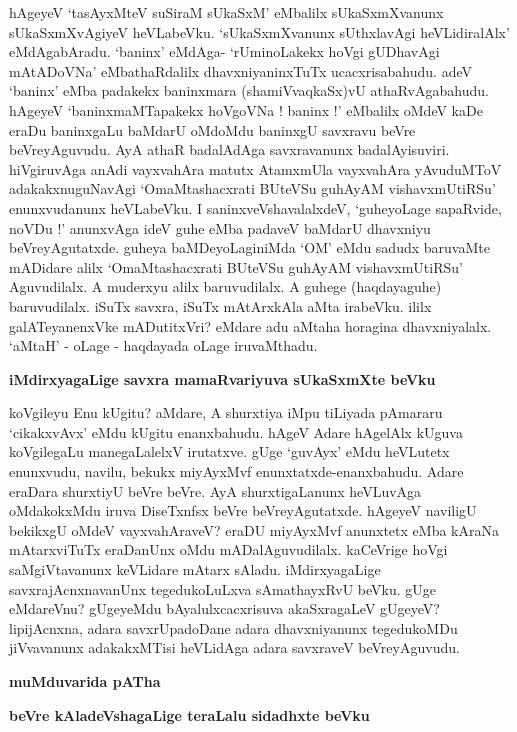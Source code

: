 \noindent
hAgeyeV `tasAyxMteV suSiraM sUkaSxM' eMbalilx sUkaSxmXvanunx sUkaSxmXvAgiyeV heVLabeVku. `sUkaSxmXvanunx sUthxlavAgi heVLidiralAlx' 
eMdAgabAradu. `baninx' eMdAga- `rUminoLakekx hoVgi gUDhavAgi mAtADoVNa' eMbathaRdalilx dhavxniyaninxTuTx ucacxrisabahudu. adeV `baninx' eMba padakekx baninxmara (shamiVvaqkaSx)vU athaRvAgabahudu. hAgeyeV `baninxmaMTapakekx hoVgoVNa ! baninx !' eMbalilx oMdeV kaDe eraDu baninxgaLu baMdarU oMdoMdu baninxgU savxravu beVre beVreyAguvudu. AyA athaR badalAdAga savxravanunx badalAyisuviri. hiVgiruvAga anAdi vayxvahAra matutx AtamxmUla vayxvahAra yAvuduMToV adakakxnuguNavAgi `OmaMtashacxrati BUteVSu guhAyAM vishavxmUtiRSu'\label{125} enunxvudanunx heVLabeVku. I saninxveVshavalalxdeV, `guheyoLage sapaRvide, noVDu !' anunxvAga ideV guhe eMba padaveV baMdarU dhavxniyu beVreyAgutatxde. guheya baMDeyoLaginiMda `OM' eMdu sadudx baruvaMte mADidare alilx `OmaMtashacxrati BUteVSu guhAyAM vishavxmUtiRSu' Aguvudilalx. A muderxyu alilx baruvudilalx. A guhege (haqdayaguhe) baruvudilalx. iSuTx savxra, iSuTx mAtArxkAla aMta irabeVku. ililx galATeyanenxVke mADutitxVri? eMdare adu aMtaha horagina dhavxniyalalx. `aMtaH' - oLage - haqdayada oLage iruvaMthadu.

{\bigskip
\noindent
{\large\bf iMdirxyagaLige savxra mamaRvariyuva sUkaSxmXte beVku}}\label{page125}
\medskip

\noindent
koVgileyu Enu kUgitu? aMdare, A shurxtiya iMpu tiLiyada pAmararu `cikakxvAvx' eMdu kUgitu enanxbahudu. hAgeV Adare hAgelAlx kUguva koVgilegaLu manegaLalelxV irutatxve. gUge `guvAyx' eMdu heVLutetx enunxvudu, navilu, bekukx miyAyxMvf enunxtatxde-enanxbahudu. Adare eraDara shurxtiyU beVre beVre. AyA shurxtigaLanunx heVLuvAga oMdakokxMdu iruva DiseTxnfsx beVre beVreyAgutatxde. hAgeyeV naviligU bekikxgU oMdeV vayxvahAraveV? eraDU miyAyxMvf anunxtetx eMba kAraNa mAtarxviTuTx eraDanUnx oMdu mADalAguvudilalx. kaCeVrige hoVgi saMgiVtavanunx keVLidare mAtarx sAladu. iMdirxyagaLige savxrajAcnxnavanUnx tegedukoLuLxva sAmathayxRvU beVku. gUge eMdareVnu? gUgeyeMdu bAyalulxcacxrisuva akaSxragaLeV gUgeyeV? lipijAcnxna, adara savxrUpadoDane adara dhavxniyanunx tegedukoMDu jiVvavanunx adakakxMTisi heVLidAga adara savxraveV beVreyAguvudu. 

{\bigskip
\noindent
{\Large\bf muMduvarida pATha}}

{\bigskip
\noindent
{\large\bf beVre kAladeVshagaLige teraLalu sidadhxte beVku}}\label{page126}
\medskip

